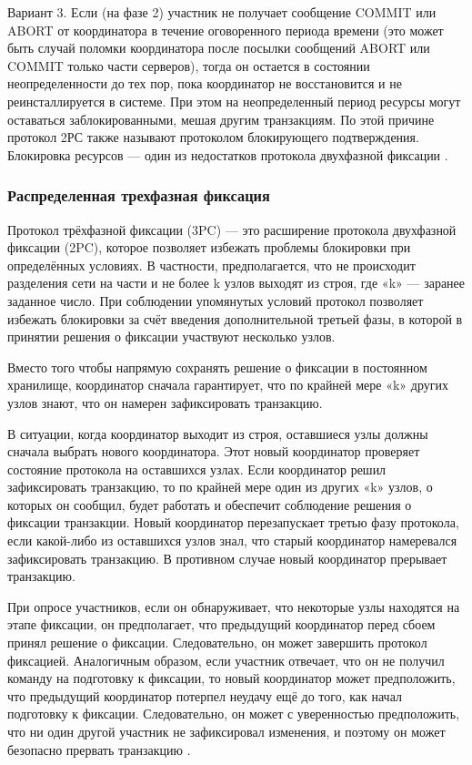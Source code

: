 Вариант 3. Если (на фазе 2) участник не получает сообщение COMMIT или ABORT от координатора в течение оговоренного периода времени (это может быть случай 
поломки координатора после посылки сообщений ABORT или COMMIT только части серверов), тогда он остается в состоянии неопределенности до тех пор, пока 
координатор не восстановится и не реинсталлируется в системе. При этом на неопределенный период ресурсы могут оставаться заблокированными, мешая другим 
транзакциям. По этой причине протокол 2РС также называют протоколом блокирующего подтверждения. Блокировка ресурсов — один из недостатков протокола 
двухфазной фиксации \autocite{Fix}.

\subsubsection{Распределенная трехфазная фиксация}

Протокол трёхфазной фиксации (3PC) — это расширение протокола двухфазной фиксации (2PC), которое позволяет избежать проблемы блокировки при определённых условиях. В частности, 
предполагается, что не происходит разделения сети на части и не более k узлов выходят из строя, где «k» — заранее заданное число. При соблюдении упомянутых условий протокол позволяет 
избежать блокировки за счёт введения дополнительной третьей фазы, в которой в принятии решения о фиксации участвуют несколько узлов.

Вместо того чтобы напрямую сохранять решение о фиксации в постоянном хранилище, координатор сначала гарантирует, что по крайней мере «k» других узлов знают, что он намерен зафиксировать 
транзакцию.

В ситуации, когда координатор выходит из строя, оставшиеся узлы должны сначала выбрать нового координатора. Этот новый координатор проверяет состояние протокола на оставшихся узлах. 
Если координатор решил зафиксировать транзакцию, то по крайней мере один из других «k» узлов, о которых он сообщил, будет работать и обеспечит соблюдение решения о фиксации транзакции. 
Новый координатор перезапускает третью фазу протокола, если какой-либо из оставшихся узлов знал, что старый координатор намеревался зафиксировать транзакцию. В противном случае новый 
координатор прерывает транзакцию.

При опросе участников, если он обнаруживает, что некоторые узлы находятся на этапе фиксации, он предполагает, что предыдущий координатор перед сбоем принял решение о фиксации.
Следовательно, он может завершить протокол фиксацией. Аналогичным образом, если участник отвечает, что он не получил команду на подготовку к фиксации, то новый координатор может 
предположить, что предыдущий координатор потерпел неудачу ещё до того, как начал подготовку к фиксации. Следовательно, он может с уверенностью предположить, что ни один другой участник 
не зафиксировал изменения, и поэтому он может безопасно прервать транзакцию \autocite{3PC}.

